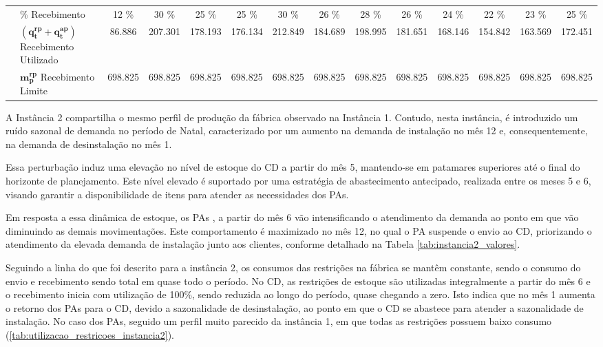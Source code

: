 \begin{table}
{\begin{tabular}{|l|l|c|c|c|c|c|c|c|c|c|c|c|c|}
& $\mathbf{\%}$ Recebimento & 12 \% & 30 \% & 25 \% & 25 \% & 30 \% & 26 \% & 28 \% & 26 \% & 24 \% & 22 \% & 23 \% & 25 \% \\\cline{2-14}
& $(\mathbf{q^{rp}_{t} + q^{ap}_{t}})$ Recebimento Utilizado & 86.886 & 207.301 & 178.193 & 176.134 & 212.849 & 184.689 & 198.995 & 181.651 & 168.146 & 154.842 & 163.569 & 172.451 \\\cline{2-14}
& $\mathbf{m^{rp}_{p}}$ Recebimento Limite & 698.825 & 698.825 & 698.825 & 698.825 & 698.825 & 698.825 & 698.825 & 698.825 & 698.825 & 698.825 & 698.825 & 698.825 \\
\hline
\end{tabular}%
}
\fdadospesquisa
\end{table}

A Instância 2 compartilha o mesmo perfil de produção da fábrica observado na Instância 1. Contudo, nesta instância, é introduzido um ruído sazonal de demanda no período de Natal, caracterizado por um aumento na demanda de instalação no mês 12 e, consequentemente, na demanda de desinstalação no mês 1.

Essa perturbação induz uma elevação no nível de estoque do CD a partir do mês 5, mantendo-se em patamares superiores até o final do horizonte de planejamento. Este nível elevado é suportado por uma estratégia de abastecimento antecipado, realizada entre os meses 5 e 6, visando garantir a disponibilidade de itens para atender as necessidades dos PAs.

Em resposta a essa dinâmica de estoque, os PAs , a partir do mês 6 vão intensificando o atendimento da demanda ao ponto em que vão diminuindo as demais movimentações. Este comportamento é maximizado no mês 12, no qual o PA suspende o envio ao CD, priorizando o atendimento da elevada demanda de instalação junto aos clientes, conforme detalhado na Tabela \autoref{tab:instancia2_valores}.

Seguindo a linha do que foi descrito para a instância 2, os consumos das restrições na fábrica se mantêm constante, sendo o consumo do envio e recebimento sendo total em quase todo o período. No CD, as restrições de estoque são utilizadas integralmente a partir do mês 6 e o recebimento inicia com utilização de 100\%, sendo reduzida ao longo do período, quase chegando a zero. Isto indica que no mês 1 aumenta o retorno dos PAs para o CD, devido a sazonalidade de desinstalação, ao ponto em que o CD se abastece para atender a sazonalidade de instalação. No caso dos PAs, seguido um perfil muito parecido da instância 1, em que todas as restrições possuem baixo consumo (\autoref{tab:utilizacao_restricoes_instancia2}).

